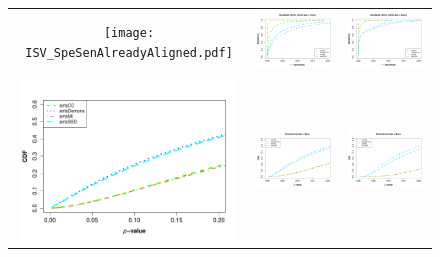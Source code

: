\documentclass[final,5p,times,twocolumn]{elsarticle}
\begin{document}
\begin{figure}
\begin{center}
\begin{tabular}{ccc}
  \texttt{[image: ISV\_SpeSenAlreadyAligned.pdf]} &
  \includegraphics[width=57mm]{ISV_SpeSenAlreadyAlignedSmooth0.pdf} &
  \includegraphics[width=57mm]{ISV_SpeSenAlreadyAlignedSmooth1.pdf} \\
  \includegraphics[width=57mm]{ISV_CDFAlreadyAligned.pdf} &
  \includegraphics[width=57mm]{ISV_CDFAlreadyAlignedSmooth0.pdf} &
  \includegraphics[width=57mm]{ISV_CDFAlreadyAlignedSmooth1.pdf} \\

\end{tabular}
\end{center}
\end{figure}
\end{document}
